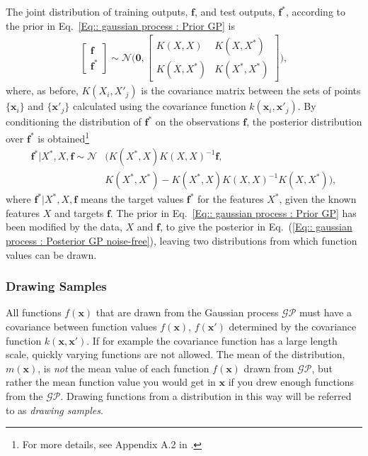 \documentclass[twoside,english]{uiofysmaster}
\begin{document}
{The joint distribution of training outputs, $\textbf{f}$, and test outputs, $\textbf{f}^*$, according to the prior in Eq.~\ref{Eq:: gaussian process : Prior GP} is
\begin{align}
\begin{bmatrix}
\textbf{f}\\
\textbf{f}^*
\end{bmatrix}
\sim 
\mathcal{N} \Bigg(
\boldsymbol{0},
\begin{bmatrix}
K(X, X) & K(X, X^*)\\
K(X, X^*) & K(X^*, X^*)
\end{bmatrix}
 \Bigg),
\end{align}
where, as before, $K(X_i, X'_j)$ is the covariance matrix between the sets of points $\{ \textbf{x}_i \}$ and $\{\textbf{x}'_j \}$ calculated using the covariance function $k(\textbf{x}_i, \textbf{x}'_j)$. By conditioning the distribution of $\textbf{f}^*$ on the observations $\textbf{f}$,  the posterior distribution over $\textbf{f}^*$ is obtained\footnote{For more details, see Appendix A.2 in \cite{rasmussen2006gaussian}.}  \cite{rasmussen2006gaussian} 
\begin{align}\label{Eq:: gaussian process : Posterior GP noise-free}
\textbf{f}^* \big| X^*, X, \textbf{f} \sim \mathcal{N}&(K(X^*, X)K(X, X)^{-1} \textbf{f},\\ &K(X^*, X^*) - K(X^*, X)K(X, X)^{-1}K(X, X^*)),
\end{align}
where $\textbf{f}^* | X^*, X, \textbf{f}$ means the target values $\textbf{f}^*$ for the features $X^*$, given the known features $X$ and targets $\textbf{f}$. The prior in Eq.~\ref{Eq:: gaussian process : Prior GP} has been modified by the data, $X$ and $\textbf{f}$, to give the posterior in Eq.~(\ref{Eq:: gaussian process : Posterior GP noise-free}), leaving two distributions from which function values can be drawn.


\subsubsection{Drawing Samples}
All functions $f(\textbf{x})$ that are drawn from the Gaussian process $\mathcal{GP}$ must have a covariance between function values $f(\textbf{x})$, $f(\textbf{x}')$ determined by the covariance function $k(\textbf{x}, \textbf{x}')$. If for example the covariance function has a large length scale, quickly varying functions are not allowed. The mean of the distribution, $m(\textbf{x})$, is \textit{not} the mean value of each function $f(\textbf{x})$ drawn from $\mathcal{GP}$, but rather the mean function value you would get in $\textbf{x}$ if you drew enough functions from the $\mathcal{GP}$. Drawing functions from a distribution in this way will be referred to as \textit{drawing samples}.

}
\end{document}

